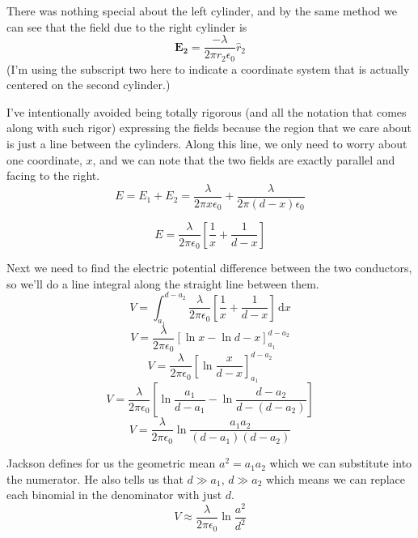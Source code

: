 \documentclass[10pt,a4paper]{article}
\begin{document}
There was nothing special about the left cylinder, and by the same method we can see that the field due to the right cylinder is
\begin{equation}
\mathbf{E_2}= \frac{-\lambda}{2\pi r_2 \epsilon_0}\hat{r}_2
\end{equation}
(I'm using the subscript two here to indicate a coordinate system that is actually centered on the second cylinder.)

I've intentionally avoided being totally rigorous (and all the notation that comes along with such rigor) expressing the fields because the region that we care about is just a line between the cylinders.  Along this line, we only need to worry about one coordinate, $x$, and we can note that the two fields are exactly parallel and facing to the right.
\begin{equation}
E=E_1+E_2=\frac{\lambda}{2\pi x \epsilon_0}+\frac{\lambda}{2\pi (d-x) \epsilon_0}
\end{equation}

\begin{equation}
E=\frac{\lambda}{2\pi\epsilon_0}\left[\frac{1}{x}+\frac{1}{d-x}\right]
\end{equation}

Next we need to find the electric potential difference between the two conductors, so we'll do a line integral along the straight line between them.
\begin{equation}
V=\int_{a_1}^{d-a_2}\frac{\lambda}{2\pi\epsilon_0}\left[\frac{1}{x}+\frac{1}{d-x}\right]\,\mathrm{d}x
\end{equation}
\begin{equation}
V=\frac{\lambda}{2\pi\epsilon_0}\left[\ln x - \ln d-x \right]_{a_1}^{d-a_2}
\end{equation}
\begin{equation}
V=\frac{\lambda}{2\pi\epsilon_0}\left[\ln \frac{x}{d-x} \right]_{a_1}^{d-a_2}
\end{equation}
\begin{equation}
V=\frac{\lambda}{2\pi\epsilon_0}\left[\ln \frac{a_1}{d-a_1} - \ln \frac{d-a_2}{d-(d-a_2)} \right]
\end{equation}
\begin{equation}
V=\frac{\lambda}{2\pi\epsilon_0}\ln \frac{a_1 a_2}{(d-a_1)(d-a_2)}
\end{equation}

Jackson defines for us the geometric mean $a^2=a_1a_2$ which we can substitute into the numerator. He also tells us that $d \gg a_1$, $d \gg a_2$ which means we can replace each binomial in the denominator with just $d$.
\begin{equation}
V \approx \frac{\lambda}{2\pi\epsilon_0}\ln \frac{a^2}{d^2}
\end{equation}
\end{document}
